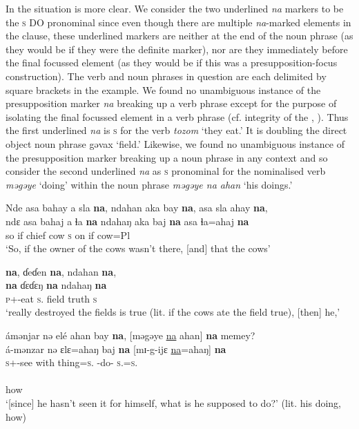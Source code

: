 In   the situation is more clear. We consider the two underlined \textit{na}  markers to be the \textsc{s} DO pronominal since even though there are multiple \textit{na}{}-marked elements in the clause, these underlined markers are neither at the end of the noun phrase (as they would be if they were the definite marker), nor are they immediately before the final focussed element (as they would be if this was a presupposition-focus construction). The verb and noun phrases in question are each delimited by square brackets in the example. We found no unambiguous instance of the presupposition marker \textit{na} breaking up a verb phrase except for the purpose of isolating the final focussed element in a verb phrase (cf. integrity of the \VP, ). Thus the first underlined \textit{na}  is \textsc{s} \DO for the verb \textit{tozom} ‘they eat.’ It is doubling the direct object noun phrase gəvax ‘field.' Likewise, we found no unambiguous instance of the presupposition marker breaking up a noun phrase in any context and so consider the second underlined \textit{na} as \textsc{s} \DO pronominal for the nominalised verb \textit{məgəye} ‘doing’ within the noun phrase \textit{məgəye na ahan} ‘his doings.’  

\largerpage
\ea \label{ex:11:53}
Nde  asa  bahay  a  sla  \textbf{na},  ndahan  aka  bay  \textbf{na}, asa  sla  ahay  \textbf{na},\\ 
\gll  ndɛ  asa   bahaj  a  ɬa  \textbf{na}  ndahaŋ  aka   baj  \textbf{na} asa ɬa=ahaj \textbf{na}\\ 
      so  if  chief  {\GEN}  cow  {\PSP}  \textsc{s}  on  {\NEG}  {\PSP} if  cow=Pl  {\PSP} \\ 
\glt ‘So, if the owner of the cows wasn’t there, [and] that the cows’ 

  \textbf{na},  ɗeɗen  \textbf{na},  ndahan  \textbf{na},\\  
 \textbf{na} {ɗɛɗɛŋ} \textbf{na} {ndahaŋ} \textbf{na}\\  
     \textsc{p}+{\PFV}-eat  \textsc{s}.{\DO}  field  {\PSP}  truth  {\PSP} \textsc{s} {\PSP} \\ 
\glt ‘really destroyed the fields  is true (lit. if the cows ate the field true), [then] he,’

\medskip
ámənjar  nə  elé  ahan  bay  \textbf{na},  [məgəye  \underline{na}  ahan]  \textbf{na}  memey?\\
\gll á-mənzar nə ɛlɛ=ahaŋ baj \textbf{na} [{mɪ-g-ijɛ} \underline{na}{=ahaŋ}] \textbf{na}\\ 
     \textsc{s}+{\IFV}-see  with  thing=\textsc{s}.{\POSS}  {\NEG}  {\PSP} {\NOM}-do{}-{\CL} \textsc{s}.{\DO}=\textsc{s}.{\POSS}  {\PSP}\\  
     
     \medskip
{}\\
     how\\
\glt  ‘[since] he hasn’t seen it for himself, what is he supposed to do?’ (lit. his doing, how)
\z
{}